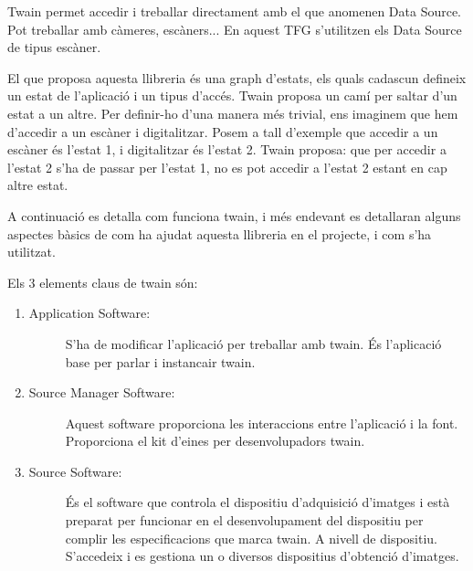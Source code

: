 \documentclass[letterpaper,11pt,catalan]{sphinxmanual}
\begin{document}
Twain permet accedir i treballar directament amb el que anomenen Data Source.
Pot treballar amb càmeres, escàners... En aquest TFG s'utilitzen els Data
Source de tipus escàner.

El que proposa aquesta llibreria és una graph d'estats, els quals cadascun
defineix un estat de l'aplicació i un tipus d'accés. Twain proposa un \sphinxquotedblleft{}camí\sphinxquotedblright{} per
saltar d'un estat a un altre. Per definir-ho d'una manera més trivial, ens imaginem
que hem d'accedir a un escàner i digitalitzar. Posem a tall d'exemple que accedir
a un escàner és l'estat 1, i digitalitzar és l'estat 2. Twain proposa: que per
accedir a l'estat 2 s'ha de passar per l'estat 1, no es pot accedir a l'estat
2 estant en cap altre estat.

A continuació es detalla com funciona twain, i més endevant es detallaran alguns
aspectes bàsics de com ha ajudat aquesta llibreria en el projecte, i com s'ha utilitzat.

Els 3 elements claus de twain són:
\begin{enumerate}
\item {} \begin{description}
\item[{Application Software:}] \leavevmode
S'ha de modificar l'aplicació per treballar amb twain. És l'aplicació base
per parlar i instancair twain.

\end{description}

\item {} \begin{description}
\item[{Source Manager Software:}] \leavevmode
Aquest software proporciona les interaccions entre l'aplicació i la font. Proporciona
el kit d'eines per desenvolupadors twain.

\end{description}

\item {} \begin{description}
\item[{Source Software:}] \leavevmode
És el software que controla el dispositiu d'adquisició d'imatges i està preparat
per funcionar en el desenvolupament del dispositiu per complir les especificacions
que marca twain. A nivell de dispositiu. S'accedeix i es gestiona un o diversos
dispositius d'obtenció d'imatges.

\end{description}

\end{enumerate}
\end{document}

